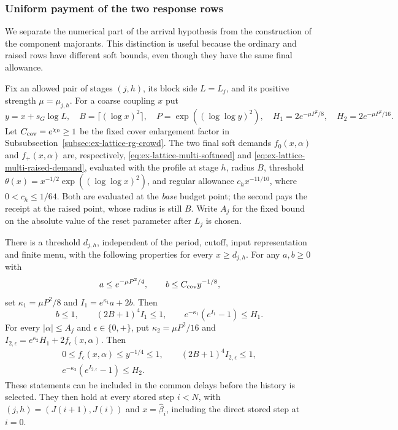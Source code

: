 \subsubsection{Uniform payment of the two response rows}
\label{sec:selected-response-payments}

We separate the numerical part of the arrival hypothesis from the
construction of the component majorants. This distinction is useful
because the ordinary and raised rows have different soft bounds, even
though they have the same final allowance.

Fix an allowed pair of stages $(j,h)$, its block side $L=L_j$, and
its positive strength $\mu=\mu_{j,h}$. For a coarse coupling $x$ put
\[
 y=x+s_G\log L,\quad B=\lceil(\log x)^2\rceil,\quad
 P=\exp((\log\log y)^2),\quad
 H_1=2e^{-\mu P^2/8},\quad H_2=2e^{-\mu P^2/16}.
\]
Let $C_{\rm cov}=e^{\chi_0}\ge1$ be the fixed cover enlargement
factor in Subsubsection~\ref{subsec:ex-lattice-rg-crowd}. The two final
soft demands $f_0(x,\alpha)$ and $f_+(x,\alpha)$ are, respectively,
\eqref{eq:ex-lattice-multi-softneed} and
\eqref{eq:ex-lattice-multi-raised-demand}, evaluated with the profile
at stage $h$, radius $B$, threshold
$\theta(x)=x^{-1/2}\exp((\log\log x)^2)$, and regular allowance
$c_hx^{-11/10}$, where $0<c_h\le1/64$. Both are evaluated at the
\emph{base} budget point; the second pays the receipt at the raised
point, whose radius is still $B$. Write $A_j$ for the fixed bound
on the absolute value of the reset parameter after $L_j$ is chosen.

\begin{lemma}
\label{lem:selected-response-payments}
There is a threshold $d_{j,h}$, independent of the period, cutoff,
input representation and finite menu, with the following properties
for every $x\ge d_{j,h}$. For any $a,b\ge0$ with
\[
 a\le e^{-\mu P^2/4},\qquad b\le C_{\rm cov}y^{-1/8},
\]
set $\kappa_1=\mu P^2/8$ and $I_1=e^{\kappa_1}a+2b$.
Then
\begin{equation}\label{eq:selected-first-response-payment}
 b\le1,\qquad (2B+1)^4I_1\le1,\qquad
 e^{-\kappa_1}(e^{I_1}-1)\le H_1.
\end{equation}
For every $|\alpha|\le A_j$ and $\epsilon\in\{0,+\}$, put
$\kappa_2=\mu P^2/16$ and
$I_{2,\epsilon}=e^{\kappa_2}H_1+2f_\epsilon(x,\alpha)$.
Then
\begin{equation}\label{eq:selected-second-response-payment}
 \begin{gathered}
 0\le f_\epsilon(x,\alpha)\le y^{-1/4}\le1,\qquad
 (2B+1)^4I_{2,\epsilon}\le1,\\
 e^{-\kappa_2}(e^{I_{2,\epsilon}}-1)\le H_2.
 \end{gathered}
\end{equation}
These statements can be included in the common delays before the
history is selected. They then hold at every stored step $i<N$,
with $(j,h)=(J(i+1),J(i))$ and $x=\widehat\beta_i$, including
the direct stored step at $i=0$.
\end{lemma}

